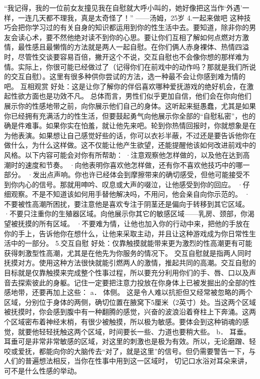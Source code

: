 \documentclass[12pt,UTF8,openany]{ctexbook}
\begin{document}
“我记得，我的一位前女友撞见我在自慰就大呼小叫的，她好像把这当作‘外遇’一样，一连几天都不理我，真是太奇怪了！”
——汤姆，25岁
4.一起来做吧
这种技巧会把你学习过的有关自身的知识都运用到你的性生活中去。要知道，除非你的男友会读心术，要不然他绝对读不到你的心思。要让你们互相了解如何点燃对方激情，最性感且最懒惰的方法就是两人一起自慰。在你们俩人赤身裸体、热情四溢时，尽管性交谈要容易百倍，撇开这个不说，交互自慰也不会像你想的那样难为情。实际上，你很可能已经做过了（记得你们在前戏中的动作吗？那就是我们所说的交互自慰）。这里有很多种供你尝试的方法，选一种最不会让你感到难为情的吧。
互相观赏
好处：这是让你了解你的伴侣喜欢哪种爱抚游戏的绝好机会，在激起性欲方面也是功效不凡。
总体而言，男性们似乎更加自信，他们会在你向他们展示你的性感地带之前，向你展示他们自己的身体。这听起来挺愚蠢，尤其是如果你已经拥有充满活力的性生活，但要鼓起勇气向他展示你全部的“自慰私密”，也的确是件难事。如果你实在怕羞，就让他先来吧。轮到你热情回报时，你就想象是在为他表演。如果想让自己感觉好些的话，你可以衣衫半蔽，不过还是要告诉他你在做什么，为什么这样做。这不仅能让他产生欲望，还能提醒他该如何改进前戏中的风格。以下内容可能会对你有所帮助：
·注意观察他怎样做的，以及他在达到高潮时的速度和节奏。
·向他表明你喜欢他怎样做，还有你不喜欢他技巧中的哪一部分。
·发出点声响。你也许已经体会到摩擦带来的确切感受，但他可能接受不到你内心的信号。那就用呻吟、叹息或大声的啜泣，让他感受到你的回应。
·仔细观察。不是不知道该如何用手替他解决吗，不用问，他会亲自向你示范的。
·不要被性高潮所困扰，要注意他是喜欢专注于阴茎还是偏向于转移到其它区域。
·不要只注重你的生殖器区域。向他展示你其它的敏感区域——乳房、颈部，你渴望被抚摸的所有区域。
·不要难为情，让他也加入你的行动中来，把他的手放在你的手上，告诉他你在想什么，让他来采取主动，并且让这种游戏成为你日常性生活中的一部分。
5.交互自慰
好处：仅靠触摸就能带来更为激烈的性高潮更有可能获得刺激型性高潮，尤其是在他先为你服务的情况下。
交互自慰就是指两人同时抚摸对方。使用这种方法很快就能引燃两人的激情，推起共同的高潮。交互自慰的目标就是仅靠触摸来完成整个性事过程，所以要充分利用你们的手、唇、口以及声音去探索彼此的身躯。记住一定要把注意力投放在你身体上已被发掘出的全部的性感地带，还要再加上这些：
a． 体侧。
这是令人难以抗拒但又经常被忽略的两个区域，分别位于身体的两侧，确切位置在腋窝下5厘米（2英寸）处。当这两个区域被抚摸时，你会感到腹中有一种翻腾的感觉，兴奋的波浪沿着脊柱上下奔涌。这两个区域密布着神经末梢，有很少被触摸，所以极为敏感。要体会到这种销魂的感觉，就要他轻轻抚触这两个区域，时间要长一些、力道也要稍大些。
b． 耳垂。
耳垂可是非常非常敏感的区域，对这里的刺激也是极为有效。所以，无论磨蹭、轻咬或爱抚，都能向你的大脑传去“对了，就是这里”的信号。但仍需要警告一下，与人们的普遍想法相反，当你在性事中用到这一区域时， 切记口水浴对耳朵来讲，可不是什么性感的举动。
\end{document}
